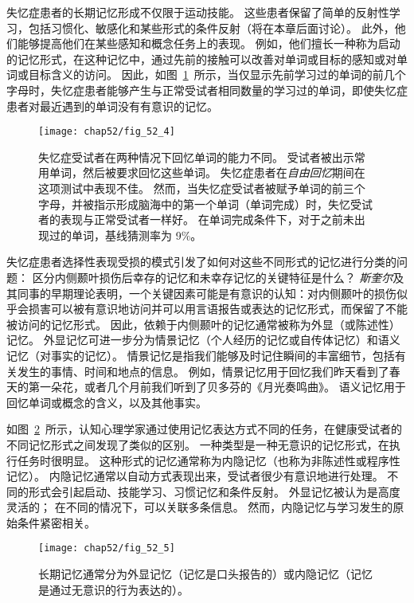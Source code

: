 失忆症患者的长期记忆形成不仅限于运动技能。
这些患者保留了简单的反射性学习，包括习惯化、敏感化和某些形式的条件反射（将在本章后面讨论）。
此外，他们能够提高他们在某些感知和概念任务上的表现。
例如，他们擅长一种称为启动的记忆形式，在这种记忆中，通过先前的接触可以改善对单词或目标的感知或对单词或目标含义的访问。
因此，如图~\ref{fig:52_4}~所示，当仅显示先前学习过的单词的前几个字母时，失忆症患者能够产生与正常受试者相同数量的学习过的单词，即使失忆症患者对最近遇到的单词没有有意识的记忆。


\begin{figure}[htbp]
	\centering
	\texttt{[image: chap52/fig\_52\_4]}
	\caption{失忆症受试者在两种情况下回忆单词的能力不同。
		受试者被出示常用单词，然后被要求回忆这些单词。
		失忆症患者在\textit{自由回忆}期间在这项测试中表现不佳。
		然而，当失忆症受试者被赋予单词的前三个字母，并被指示形成脑海中的第一个单词（单词完成）时，失忆受试者的表现与正常受试者一样好。
		在单词完成条件下，对于之前未出现过的单词，基线猜测率为 9\%\cite{squire1987memory}。}
	\label{fig:52_4}
\end{figure}


失忆症患者选择性表现受损的模式引发了如何对这些不同形式的记忆进行分类的问题：
区分内侧颞叶损伤后幸存的记忆和未幸存记忆的关键特征是什么？
\textit{斯奎尔}及其同事的早期理论表明，一个关键因素可能是有意识的认知：对内侧颞叶的损伤似乎会损害可以被有意识地访问并可以用言语报告或表达的记忆形式，而保留了不能被访问的记忆形式。
因此，依赖于内侧颞叶的记忆通常被称为外显（或陈述性）记忆。
外显记忆可进一步分为情景记忆（个人经历的记忆或自传体记忆）和语义记忆（对事实的记忆）。
情景记忆是指我们能够及时记住瞬间的丰富细节，包括有关发生的事情、时间和地点的信息。
例如，情景记忆用于回忆我们昨天看到了春天的第一朵花，或者几个月前我们听到了贝多芬的《月光奏鸣曲》。
语义记忆用于回忆单词或概念的含义，以及其他事实。


如图~\ref{fig:52_5}~所示，认知心理学家通过使用记忆表达方式不同的任务，在健康受试者的不同记忆形式之间发现了类似的区别。
一种类型是一种无意识的记忆形式，在执行任务时很明显。
这种形式的记忆通常称为内隐记忆（也称为非陈述性或程序性记忆）。
内隐记忆通常以自动方式表现出来，受试者很少有意识地进行处理。
不同的形式会引起启动、技能学习、习惯记忆和条件反射。
外显记忆被认为是高度灵活的；
在不同的情况下，可以关联多条信息。
然而，内隐记忆与学习发生的原始条件紧密相关。


\begin{figure}[htbp]
	\centering
	\texttt{[image: chap52/fig\_52\_5]}
	\caption{长期记忆通常分为外显记忆（记忆是口头报告的）或内隐记忆（记忆是通过无意识的行为表达的）。}
	\label{fig:52_5}
\end{figure}


